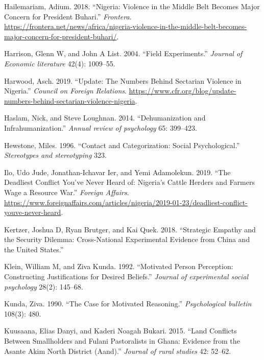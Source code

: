 \documentclass[11pt]{article}
\begin{document}
\leavevmode\hypertarget{ref-frontera2018nigeria}{}%
Hailemariam, Adium. 2018. ``Nigeria: Violence in the Middle Belt Becomes
Major Concern for President Buhari.'' \emph{Frontera}.
\url{https://frontera.net/news/africa/nigeria-violence-in-the-middle-belt-becomes-major-concern-for-president-buhari/}.

\leavevmode\hypertarget{ref-harrison2004field}{}%
Harrison, Glenn W, and John A List. 2004. ``Field Experiments.''
\emph{Journal of Economic literature} 42(4): 1009--55.

\leavevmode\hypertarget{ref-council2019nigeria}{}%
Harwood, Asch. 2019. ``Update: The Numbers Behind Sectarian Violence in
Nigeria.'' \emph{Council on Foreign Relations}.
\url{https://www.cfr.org/blog/update-numbers-behind-sectarian-violence-nigeria}.

\leavevmode\hypertarget{ref-haslam2014dehumanization}{}%
Haslam, Nick, and Steve Loughnan. 2014. ``Dehumanization and
Infrahumanization.'' \emph{Annual review of psychology} 65: 399--423.

\leavevmode\hypertarget{ref-hewstone1996contact}{}%
Hewstone, Miles. 1996. ``Contact and Categorization: Social
Psychological.'' \emph{Stereotypes and stereotyping} 323.

\leavevmode\hypertarget{ref-fa2019deadly}{}%
Ilo, Udo Jude, Jonathan-Ichavar Ier, and Yemi Adamolekun. 2019. ``The
Deadliest Conflict You've Never Heard of: Nigeria's Cattle Herders and
Farmers Wage a Resource War.'' \emph{Foreign Affairs}.
\url{https://www.foreignaffairs.com/articles/nigeria/2019-01-23/deadliest-conflict-youve-never-heard}.

\leavevmode\hypertarget{ref-kertzer2018empathy}{}%
Kertzer, Joshua D, Ryan Brutger, and Kai Quek. 2018. ``Strategic Empathy
and the Security Dilemma: Cross-National Experimental Evidence from
China and the United States.''

\leavevmode\hypertarget{ref-klein1992motivated}{}%
Klein, William M, and Ziva Kunda. 1992. ``Motivated Person Perception:
Constructing Justifications for Desired Beliefs.'' \emph{Journal of
experimental social psychology} 28(2): 145--68.

\leavevmode\hypertarget{ref-kunda1990motivatedReasoning}{}%
Kunda, Ziva. 1990. ``The Case for Motivated Reasoning.''
\emph{Psychological bulletin} 108(3): 480.

\leavevmode\hypertarget{ref-kuusaana2015land}{}%
Kuusaana, Elias Danyi, and Kaderi Noagah Bukari. 2015. ``Land Conflicts
Between Smallholders and Fulani Pastoralists in Ghana: Evidence from the
Asante Akim North District (Aand).'' \emph{Journal of rural studies} 42:
52--62.
\end{document}
